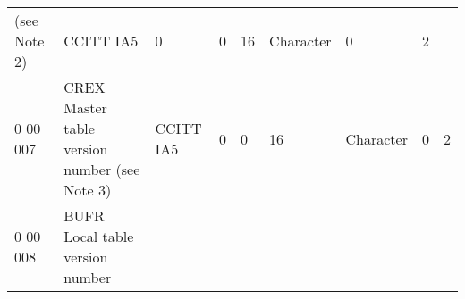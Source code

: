 \begin{longtable}[]{@{}lllllllll@{}}
\begin{minipage}[t]{0.08\columnwidth}
(see Note 2)\strut
\end{minipage} & \begin{minipage}[t]{0.08\columnwidth}\raggedright
CCITT IA5\strut
\end{minipage} & \begin{minipage}[t]{0.08\columnwidth}\raggedright
0\strut
\end{minipage} & \begin{minipage}[t]{0.08\columnwidth}\raggedright
0\strut
\end{minipage} & \begin{minipage}[t]{0.08\columnwidth}\raggedright
16\strut
\end{minipage} & \begin{minipage}[t]{0.08\columnwidth}\raggedright
Character\strut
\end{minipage} & \begin{minipage}[t]{0.08\columnwidth}\raggedright
0\strut
\end{minipage} & \begin{minipage}[t]{0.08\columnwidth}\raggedright
2\strut
\end{minipage}\tabularnewline
0 00 007 & CREX Master table version number (see Note 3) & CCITT IA5 & 0 & 0 & 16 & Character & 0 & 2\tabularnewline
\begin{minipage}[t]{0.08\columnwidth}\raggedright
0 00 008\strut
\end{minipage} & \begin{minipage}[t]{0.08\columnwidth}\raggedright
BUFR Local table version number


\end{minipage}
\end{longtable}

